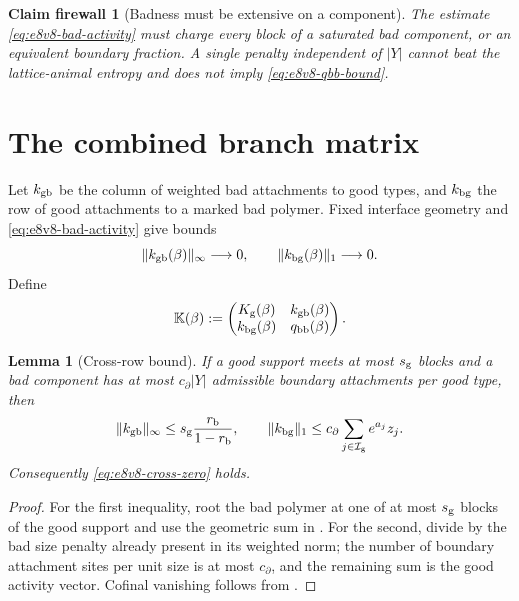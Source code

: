 \documentclass[11pt,oneside]{book}
\newtheorem{lemma}[theorem]{Lemma}
\newtheorem{firewall}[theorem]{Claim firewall}
\theoremstyle{definition}
\theoremstyle{remark}
\begin{document}
\begin{firewall}[Badness must be extensive on a component]
\label{fire:e8v8-bad-extensive}
The estimate \eqref{eq:e8v8-bad-activity} must charge every block of a
saturated bad component, or an equivalent boundary fraction.  A
single penalty independent of \(|Y|\) cannot beat the lattice-animal
entropy and does not imply \eqref{eq:e8v8-qbb-bound}.
\end{firewall}

\section{The combined branch matrix}
\label{sec:e8v8-combined}

Let \(k_{\rm gb}\) be the column of weighted bad attachments to good
types, and \(k_{\rm bg}\) the row of good attachments to a marked bad
polymer.  Fixed interface geometry and
\eqref{eq:e8v8-bad-activity} give bounds
\[
 \|k_{\rm gb}(\beta)\|_\infty\longrightarrow0,
 \qquad
 \|k_{\rm bg}(\beta)\|_1\longrightarrow0.           \label{eq:e8v8-cross-zero}
\]
Define
\[
 {\mathbb K}(\beta):=
 \begin{pmatrix}
 K_{\rm g}(\beta)&k_{\rm gb}(\beta)\\
 k_{\rm bg}(\beta)&q_{\rm bb}(\beta)
 \end{pmatrix}.                                     \label{eq:e8v8-K}
\]

\begin{lemma}[Cross-row bound]
\label{lem:e8v8-cross}
If a good support meets at most \(s_{\rm g}\) blocks and a bad
component has at most \(c_\partial|Y|\) admissible boundary
attachments per good type, then
\[
 \|k_{\rm gb}\|_\infty
 \le s_{\rm g}\frac{r_{\rm b}}{1-r_{\rm b}},\qquad
 \|k_{\rm bg}\|_1
 \le c_\partial\sum_{j\in{\mathcal I}_{\rm g}}
 e^{a_j}z_j.                                        \label{eq:e8v8-cross-bound}
\]
Consequently \eqref{eq:e8v8-cross-zero} holds.
\end{lemma}

\begin{proof}
For the first inequality, root the bad polymer at one of at most
\(s_{\rm g}\) blocks of the good support and use the geometric sum in
.  For the second, divide by the bad size
penalty already present in its weighted norm; the number of boundary
attachment sites per unit size is at most \(c_\partial\), and the
remaining sum is the good activity vector.  Cofinal vanishing follows
from .
\end{proof}
\end{document}
